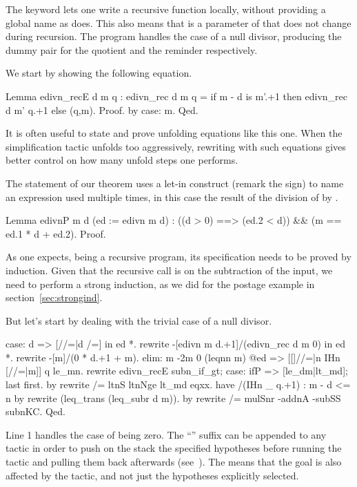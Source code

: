 The  keyword lets one write a recursive function locally, without
providing a global name as  does.  This also means that 
is a parameter of  that does not change during recursion.
The  program handles the case of a null divisor, producing
the dummy pair  for the quotient and the reminder respectively.

We start by showing the following equation.

\begin{coq}{}{}
Lemma edivn_recE d m q :
 edivn_rec d m q = if m - d is m'.+1 then edivn_rec d m' q.+1 else (q,m).
Proof. by case: m. Qed.
\end{coq}
It is often useful to state and prove unfolding equations like this one.
When the simplification tactic \C{/=} unfolds too aggressively,
rewriting with such equations gives better control on how many
unfold steps one performs.

The statement of our theorem
uses a let-in construct (remark the \C{:=} sign)
to name an expression used multiple
times, in this case the result of the division of  by .

\begin{coq}{}{}
Lemma edivnP m d (ed := edivn m d) :
  ((d > 0) ==> (ed.2 < d)) && (m == ed.1 * d + ed.2).
Proof.
\end{coq}

As one expects,  being a recursive program, its specification
needs to be proved by induction.  Given that the recursive call is on
the subtraction of the input, we need to perform a strong induction,
as we did for the postage example in section~\ref{sec:strongind}.

But let's start by dealing with the trivial case of a null divisor.

\begin{coq}{}{}
case: d => [//=|d /=] in ed *.
rewrite -[edivn m d.+1]/(edivn_rec d m 0) in ed *.
rewrite -[m]/(0 * d.+1 + m).
elim: m {-2}m 0 (leqnn m) @ed => [[]//=|n IHn [//=|m]] q le_mn.
rewrite edivn_recE subn_if_gt; case: ifP => [le_dm|lt_md]; last first.
  by rewrite /= ltnS ltnNge lt_md eqxx.
have /(IHn _ q.+1) : m - d <= n by rewrite (leq_trans (leq_subr d m)).
by rewrite /= mulSnr -addnA -subSS subnKC.
Qed.
\end{coq}
Line 1 handles the case of  being zero.  The ``'' suffix
can be appended to any tactic in order to push on the stack the specified
hypotheses before running the tactic and pulling
them back afterwards (see~\cite[section 6.5]{ssrman}).
The \C{*} means that the goal is also affected by the tactic, and not just
the hypotheses explicitly selected.

